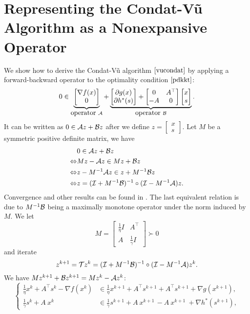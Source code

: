 \section{Representing the Condat-V\~{u} Algorithm as a Nonexpansive Operator}\label{sec:vc-op}
We show how to derive the Condat-V\~{u} algorithm $\eqref{vucondat}$ by applying a forward-backward operator to the optimality condition $\eqref{pdkkt}$:
\begin{equation}
0\in\underbrace{\begin{bmatrix}
\nabla f(x)\\
0
\end{bmatrix}}_{\mbox{operator}~\cA}+\underbrace{
\begin{bmatrix}
\partial g(x)\\
\partial h^*(s)
\end{bmatrix}+\begin{bmatrix}
0&A^\top\\
-A&0
\end{bmatrix}\begin{bmatrix}
x\\
s
\end{bmatrix}}_{\mbox{operator}~\cB}.
\end{equation} 
It can be written as $0\in{\mathcal{A}} z+{\mathcal{B}} z$ after we define $z=\begin{bmatrix}x\\ s\end{bmatrix}$. Let $M$ be a symmetric positive definite matrix, we have
\begin{align*}
&0\in\cA z+\cB z\\
\Leftrightarrow& Mz-\cA z \in Mz+\cB z\\
\Leftrightarrow& z-M^{-1}\cA z \in z+M^{-1}\cB z\\
\Leftrightarrow& z=(\cI+M^{-1}\cB)^{-1}\circ(\cI-M^{-1}\cA)z.
\end{align*}
Convergence and other results can be found in \cite{davis2014convergence}. The last equivalent relation is due to $M^{-1}{\mathcal{B}}$ being a maximally monotone operator under the norm induced by $M$. We let $$M=\begin{bmatrix}
\frac{1}{\eta}I&A^\top\\
A&\frac{1}{\gamma}I
\end{bmatrix}\succ 0$$
and iterate $$z^{k+1}={\mathcal{T}} z^k=({\mathcal{I}}+M^{-1}{\mathcal{B}})^{-1}\circ({\mathcal{I}}-M^{-1}{\mathcal{A}})z^k.$$
We have $Mz^{k+1}+{{\mathcal{B}}}z^{k+1}= Mz^k-{\mathcal{A}} z^k$:
$$\left\{\begin{array}{ll}
\frac{1}{\eta}x^k  +A^\top s^{k}- \nabla f(x^k)&\in \frac{1}{\eta}x^{k+1} + A^\top s^{k+1}+A^\top s^{k+1}+\nabla g (x^{k+1}),\\ 
\frac{1}{\gamma}s^k + A~ x^{k~}&\in \frac{1}{\gamma}s^{k+1}+ A~ x^{k+1~} -A ~x^{k+1} ~+\nabla h^*(s^{k+1}),
\end{array}\right.$$
